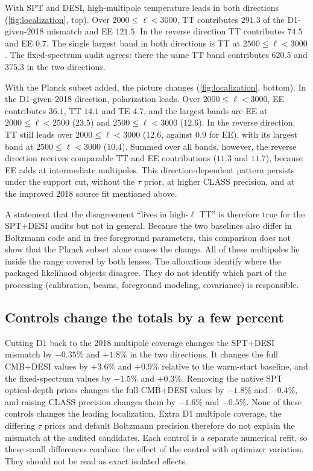 \documentclass[11pt]{article}
\theoremstyle{remark}
\numberwithin{equation}{section}
\begin{document}
With SPT and DESI, high-multipole temperature leads in both directions (\cref{fig:localization}, top). Over $2000\le\ell<3000$, TT contributes $291.3$ of the D1-given-2018 mismatch and EE $121.5$. In the reverse direction TT contributes $74.5$ and EE $0.7$. The single largest band in both directions is TT at $2500\le\ell<3000$. The fixed-spectrum audit agrees: there the same TT band contributes $620.5$ and $375.3$ in the two directions.

With the Planck subset added, the picture changes (\cref{fig:localization}, bottom). In the D1-given-2018 direction, polarization leads. Over $2000\le\ell<3000$, EE contributes $36.1$, TT $14.1$ and TE $4.7$, and the largest bands are EE at $2000\le\ell<2500$ ($23.5$) and $2500\le\ell<3000$ ($12.6$). In the reverse direction, TT still leads over $2000\le\ell<3000$ ($12.6$, against $0.9$ for EE), with its largest band at $2500\le\ell<3000$ ($10.4$). Summed over all bands, however, the reverse direction receives comparable TT and EE contributions ($11.3$ and $11.7$), because EE adds at intermediate multipoles. This direction-dependent pattern persists under the support cut, without the $\tau$ prior, at higher CLASS precision, and at the improved 2018 source fit mentioned above.

A statement that the disagreement ``lives in high-$\ell$ TT'' is therefore true for the SPT+DESI audits but not in general. Because the two baselines also differ in Boltzmann code and in free foreground parameters, this comparison does not show that the Planck subset alone causes the change. All of these multipoles lie inside the range covered by both lenses. The allocations identify where the packaged likelihood objects disagree. They do not identify which part of the processing (calibration, beams, foreground modeling, covariance) is responsible.

\subsection{Controls change the totals by a few percent}
Cutting D1 back to the 2018 multipole coverage changes the SPT+DESI mismatch by $-0.35\%$ and $+1.8\%$ in the two directions. It changes the full CMB+DESI values by $+3.6\%$ and $+0.9\%$ relative to the warm-start baseline, and the fixed-spectrum values by $-1.5\%$ and $+0.3\%$. Removing the native SPT optical-depth priors changes the full CMB+DESI values by $-1.8\%$ and $-0.4\%$, and raising CLASS precision changes them by $-1.6\%$ and $-0.5\%$. None of these controls changes the leading localization. Extra D1 multipole coverage, the differing $\tau$ priors and default Boltzmann precision therefore do not explain the mismatch at the audited candidates. Each control is a separate numerical refit, so these small differences combine the effect of the control with optimizer variation. They should not be read as exact isolated effects.
\end{document}
